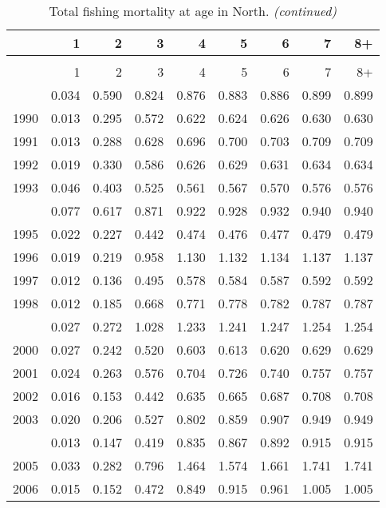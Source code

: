 \documentclass[
]{article}
\begin{document}
\begin{longtable}[t]{lrrrrrrrr}
\caption{\label{tab:North-region-FAA-table}Total fishing mortality at age in North.}\\
\toprule
  & 1 & 2 & 3 & 4 & 5 & 6 & 7 & 8+\\
\midrule
\endfirsthead
\caption[]{Total fishing mortality at age in North. \textit{(continued)}}\\
\toprule
  & 1 & 2 & 3 & 4 & 5 & 6 & 7 & 8+\\
\midrule
\endhead

\endfoot
\bottomrule
\endlastfoot
1989 & 0.034 & 0.590 & 0.824 & 0.876 & 0.883 & 0.886 & 0.899 & 0.899\\
1990 & 0.013 & 0.295 & 0.572 & 0.622 & 0.624 & 0.626 & 0.630 & 0.630\\
1991 & 0.013 & 0.288 & 0.628 & 0.696 & 0.700 & 0.703 & 0.709 & 0.709\\
1992 & 0.019 & 0.330 & 0.586 & 0.626 & 0.629 & 0.631 & 0.634 & 0.634\\
1993 & 0.046 & 0.403 & 0.525 & 0.561 & 0.567 & 0.570 & 0.576 & 0.576\\
\addlinespace
1994 & 0.077 & 0.617 & 0.871 & 0.922 & 0.928 & 0.932 & 0.940 & 0.940\\
1995 & 0.022 & 0.227 & 0.442 & 0.474 & 0.476 & 0.477 & 0.479 & 0.479\\
1996 & 0.019 & 0.219 & 0.958 & 1.130 & 1.132 & 1.134 & 1.137 & 1.137\\
1997 & 0.012 & 0.136 & 0.495 & 0.578 & 0.584 & 0.587 & 0.592 & 0.592\\
1998 & 0.012 & 0.185 & 0.668 & 0.771 & 0.778 & 0.782 & 0.787 & 0.787\\
\addlinespace
1999 & 0.027 & 0.272 & 1.028 & 1.233 & 1.241 & 1.247 & 1.254 & 1.254\\
2000 & 0.027 & 0.242 & 0.520 & 0.603 & 0.613 & 0.620 & 0.629 & 0.629\\
2001 & 0.024 & 0.263 & 0.576 & 0.704 & 0.726 & 0.740 & 0.757 & 0.757\\
2002 & 0.016 & 0.153 & 0.442 & 0.635 & 0.665 & 0.687 & 0.708 & 0.708\\
2003 & 0.020 & 0.206 & 0.527 & 0.802 & 0.859 & 0.907 & 0.949 & 0.949\\
\addlinespace
2004 & 0.013 & 0.147 & 0.419 & 0.835 & 0.867 & 0.892 & 0.915 & 0.915\\
2005 & 0.033 & 0.282 & 0.796 & 1.464 & 1.574 & 1.661 & 1.741 & 1.741\\
2006 & 0.015 & 0.152 & 0.472 & 0.849 & 0.915 & 0.961 & 1.005 & 1.005\\

\end{longtable}
\end{document}
